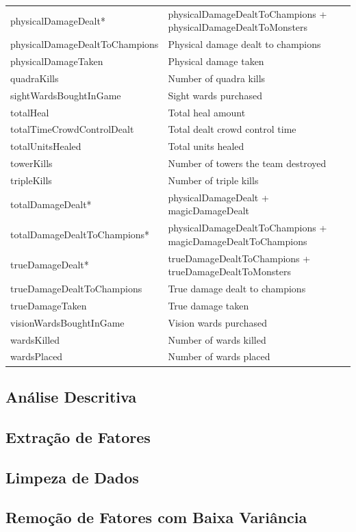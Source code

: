 \begin{table}
\begin{tabular}{p{}p{}}
physicalDamageDealt* & physicalDamageDealtToChampions + physicalDamageDealtToMonsters\\
physicalDamageDealtToChampions & Physical damage dealt to champions\\
physicalDamageTaken & Physical damage taken\\
quadraKills & Number of quadra kills\\
sightWardsBoughtInGame & Sight wards purchased\\
totalHeal & Total heal amount\\
totalTimeCrowdControlDealt & Total dealt crowd control time\\
totalUnitsHealed & Total units healed\\
towerKills & Number of towers the team destroyed\\
tripleKills & Number of triple kills\\
totalDamageDealt* & physicalDamageDealt + magicDamageDealt \\
totalDamageDealtToChampions* & physicalDamageDealtToChampions + magicDamageDealtToChampions \\
 trueDamageDealt* & trueDamageDealtToChampions + trueDamageDealtToMonsters\\
trueDamageDealtToChampions & True damage dealt to champions\\
trueDamageTaken & True damage taken\\
visionWardsBoughtInGame & Vision wards purchased\\
wardsKilled & Number of wards killed\\
wardsPlaced & Number of wards placed\\
  \bottomrule
\end{tabular}
\end{table}

\subsection{Análise Descritiva}
\subsection{Extração de Fatores}
\subsection{Limpeza de Dados}
\subsection{Remoção de Fatores com Baixa Variância}
